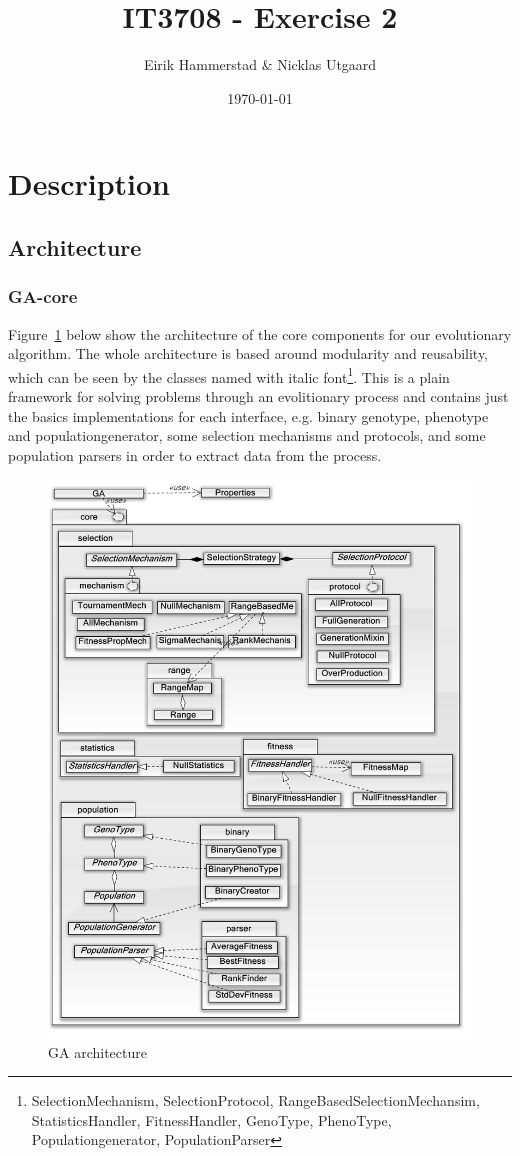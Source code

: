 \documentclass[12pt]{article}
\title{IT3708 - Exercise 2}
\author{
        Eirik Hammerstad \& Nicklas Utgaard
}
\date{\today}
\begin{document}
\maketitle
\pagebreak
\tableofcontents
\pagebreak
\section{Description}
	\subsection{Architecture}
		\subsubsection{GA-core}\label{sec:core}
			Figure~\ref{fig:gastruct} below show the architecture of the core components for our evolutionary algorithm. The whole architecture is based around modularity and reusability, which can be seen by the classes named with italic font\footnote{SelectionMechanism, SelectionProtocol, RangeBasedSelectionMechansim, StatisticsHandler, FitnessHandler, GenoType, PhenoType, Populationgenerator, PopulationParser}. This is a plain framework for solving problems through an evolitionary process and contains just the basics implementations for each interface, e.g. binary genotype, phenotype and populationgenerator, some selection mechanisms and protocols, and some population parsers in order to extract data from the process.
			
			
			\begin{figure}[H]
				\centerline{\includegraphics[width=.7\columnwidth]{./../images/GAStruct.png}}
				\caption{GA architecture}%
				\label{fig:gastruct}%
			\end{figure}
\end{document}
